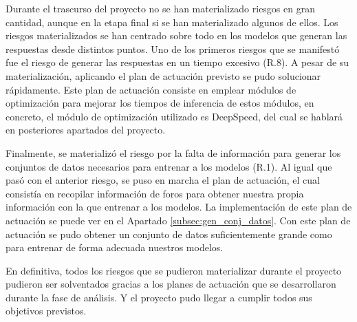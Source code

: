 Durante el trascurso del proyecto no se han materializado riesgos en gran cantidad, aunque en la etapa final si se han materializado algunos de ellos. Los riesgos materializados se han centrado sobre todo en los modelos que generan las respuestas desde distintos puntos. Uno de los primeros riesgos que se manifestó fue el riesgo de generar las respuestas en un tiempo excesivo (R.8). A pesar de su materialización, aplicando el plan de actuación previsto se pudo solucionar rápidamente. Este plan de actuación consiste en emplear módulos de optimización para mejorar los tiempos de inferencia de estos módulos, en concreto, el módulo de optimización utilizado es DeepSpeed, del cual se hablará en posteriores apartados del proyecto.

Finalmente, se materializó el riesgo por la falta de información para generar los conjuntos de datos necesarios para entrenar a los modelos (R.1). Al igual que pasó con el anterior riesgo, se puso en marcha el plan de actuación, el cual consistía en recopilar información de foros para obtener nuestra propia información con la que entrenar a los modelos. La implementación de este plan de actuación se puede ver en el Apartado \ref{subsec:gen_conj_datos}. Con este plan de actuación se pudo obtener un conjunto de datos suficientemente grande como para entrenar de forma adecuada nuestros modelos.

En definitiva, todos los riesgos que se pudieron materializar durante el proyecto pudieron ser solventados gracias a los planes de actuación que se desarrollaron durante la fase de análisis. Y el proyecto pudo llegar a cumplir todos sus objetivos previstos.


